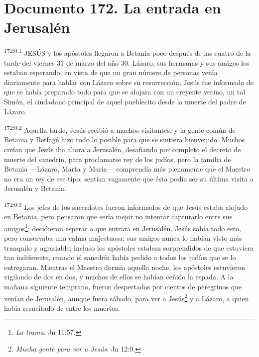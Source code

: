 \chapter{Documento 172. La entrada en Jerusalén}
\par
\textsuperscript{172:0.1} JESÚS y los apóstoles llegaron a Betania poco después de las cuatro de la tarde del viernes 31 de marzo del año 30. Lázaro, sus hermanas y sus amigos los estaban esperando; en vista de que un gran número de personas venía diariamente para hablar con Lázaro sobre su resurrección, Jesús fue informado de que se había preparado todo para que se alojara con un creyente vecino, un tal Simón, el ciudadano principal de aquel pueblecito desde la muerte del padre de Lázaro.

\par
\textsuperscript{172:0.2} Aquella tarde, Jesús recibió a muchos visitantes, y la gente común de Betania y Betfagé hizo todo lo posible para que se sintiera bienvenido. Muchos creían que Jesús iba ahora a Jerusalén, desafiando por completo el decreto de muerte del sanedrín, para proclamarse rey de los judíos, pero la familia de Betania ---Lázaro, Marta y María--- comprendía más plenamente que el Maestro no era un rey de ese tipo; sentían vagamente que ésta podía ser su última visita a Jerusalén y Betania.

\par
\textsuperscript{172:0.3} Los jefes de los sacerdotes fueron informados de que Jesús estaba alojado en Betania, pero pensaron que sería mejor no intentar capturarlo entre sus amigos\footnote{\textit{La trama}: Jn 11:57.}; decidieron esperar a que entrara en Jerusalén. Jesús sabía todo esto, pero conservaba una calma majestuosa; sus amigos nunca lo habían visto más tranquilo y agradable; incluso los apóstoles estaban sorprendidos de que estuviera tan indiferente, cuando el sanedrín había pedido a todos los judíos que se lo entregaran. Mientras el Maestro dormía aquella noche, los apóstoles estuvieron vigilando de dos en dos, y muchos de ellos se habían ceñido la espada. A la mañana siguiente temprano, fueron despertados por cientos de peregrinos que venían de Jerusalén, aunque fuera sábado, para ver a Jesús\footnote{\textit{Mucha gente para ver a Jesús}: Jn 12:9.} y a Lázaro, a quien había resucitado de entre los muertos.

